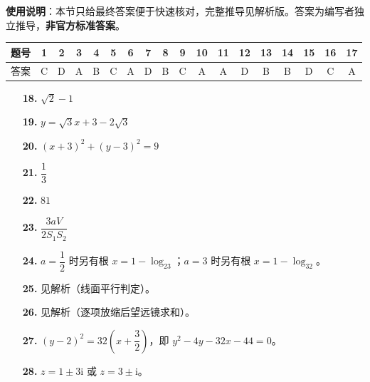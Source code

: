 
\begin{gknotice}
\textbf{使用说明}：本节只给最终答案便于快速核对，完整推导见解析版。答案为编写者独立推导，\textbf{非官方标准答案}。
\end{gknotice}

\begin{center}\begin{tabular}{cccccccccccccccccc}
\toprule
题号 & 1 & 2 & 3 & 4 & 5 & 6 & 7 & 8 & 9 & 10 & 11 & 12 & 13 & 14 & 15 & 16 & 17 \\
\midrule
答案 & C & D & A & B & C & A & D & B & C & A & A & D & B & B & D & C & A \\
\bottomrule
\end{tabular}\end{center}

\begin{itemize}[leftmargin=2.6em]
  \item[\textbf{18.}] \(\sqrt2-1\)
  \item[\textbf{19.}] \(y=\sqrt3x+3-2\sqrt3\)
  \item[\textbf{20.}] \((x+3)^2+(y-3)^2=9\)
  \item[\textbf{21.}] \(\dfrac13\)
  \item[\textbf{22.}] \(81\)
  \item[\textbf{23.}] \(\dfrac{3aV}{2S_1S_2}\)
\end{itemize}

\begin{itemize}[leftmargin=2.6em]
  \item[\textbf{24.}] \(a=\dfrac12\) 时另有根 \(x=1-\log_23\)；\(a=3\) 时另有根 \(x=1-\log_32\)。
  \item[\textbf{25.}] 见解析（线面平行判定）。
  \item[\textbf{26.}] 见解析（逐项放缩后望远镜求和）。
  \item[\textbf{27.}] \((y-2)^2=32\left(x+\dfrac32\right)\)，即 \(y^2-4y-32x-44=0\)。
  \item[\textbf{28.}] \(z=1\pm3\mathrm{i}\) 或 \(z=3\pm\mathrm{i}\)。
\end{itemize}
